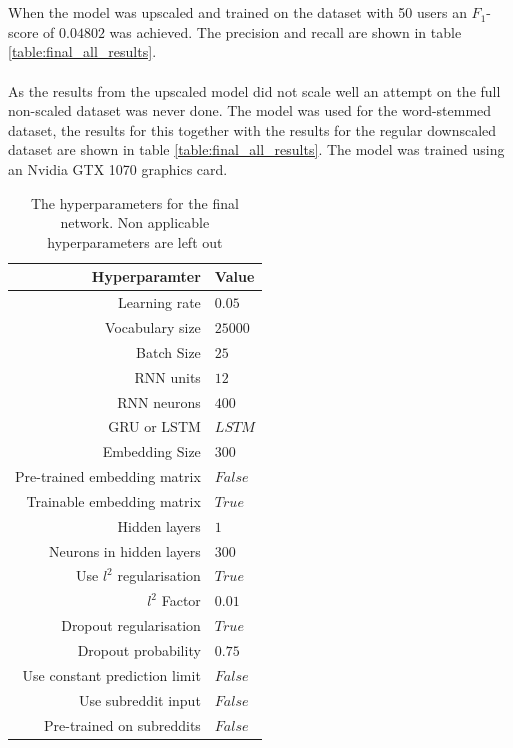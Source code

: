\\\\
When the model was upscaled and trained on the dataset with 50 users an $F_1$-score of $0.04802$ was achieved. The precision and recall are shown in table \ref{table:final_all_results}.
\\\\
As the results from the upscaled model did not scale well an attempt on the full non-scaled dataset was never done. The model was used for the word-stemmed dataset, the results for this together with the results for the regular downscaled dataset are shown in table \ref{table:final_all_results}. The model was trained using an Nvidia GTX 1070 graphics card.
\begin{table}[h!]
    \centering
    \begin{tabular}{ r  l }
        \textbf{Hyperparamter}  &  \textbf{Value} \\ \hline \hline
        Learning rate & $0.05$  \\ \hline
        Vocabulary size & $25000$ \\ \hline
        Batch Size & $25$ \\ \hline
        RNN units & $12$  \\ \hline
        RNN neurons & $400$ \\ \hline
        GRU or LSTM & $LSTM$ \\ \hline
        Embedding Size & $300$ \\ \hline
        Pre-trained embedding matrix & $False$ \\ \hline
        Trainable embedding matrix & $True$ \\ \hline
        Hidden layers & $1$ \\ \hline
        Neurons in hidden layers & $300$ \\ \hline
        Use $l^2$ regularisation & $True$ \\ \hline
        $l^2$ Factor & $0.01$ \\ \hline
        Dropout regularisation & $True$\\ \hline
        Dropout probability & $0.75$ \\ \hline
        Use constant prediction limit & $False$ \\ \hline
        Use subreddit input & $False$ \\ \hline
        Pre-trained on subreddits & $False$ \\ \hline
    \end{tabular}
    \caption{The hyperparameters for the final network. Non applicable hyperparameters are left out}
    \label{table:hyperparameters_final}
\end{table}
